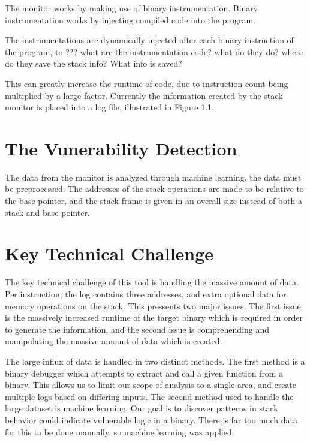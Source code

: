 \documentclass{article}
\begin{document}
The monitor works by making use of binary instrumentation.  
Binary
instrumentation works by injecting compiled code into the program. 

The instrumentations are dynamically injected after each binary instruction of the program, to ??? what are the instrumentation code? what do they do? where do they save the stack info? What info is saved?

This can greatly increase the runtime of code, due to instruction count being multiplied
by a large factor. 
Currently the information created by the stack monitor is
placed into a log file, illustrated in Figure 1.1.  

\section {The Vunerability Detection}
The data from the monitor
is analyzed through machine learning, the data must be preprocessed.  The
addresses of the stack operations are made to be relative to the base pointer,
and the stack frame is given in an overall size instead of both a stack and base
pointer.

\section{Key Technical Challenge}

The key technical challenge of this tool is handling the massive amount of data.
Per instruction, the log contains three addresses, and extra optional data for
memory operations on the stack. This pressents two major issues. The first issue
is the massively increased runtime of the target binary which is required in
order to generate the information, and the second issue is comprehending and
manipulating the massive amount of data which is created. \par
    The large influx of data is handled in two distinct methods. The first method
is a binary debugger which attempts to extract and call a given function from a
binary. This allows us to limit our scope of analysis to a single area, and
create multiple logs based on differing inputs. The second method used to handle
the large dataset is machine learning.  Our goal is to discover patterns in
stack behavior could indicate vulnerable logic in a binary.  There is far too
much data for this to be done manually, so machine learning was applied.
\end{document}

